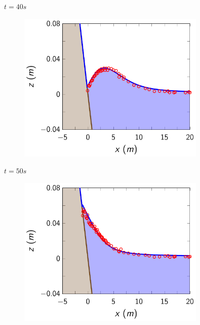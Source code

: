 \documentclass[]{beamer}
\begin{document}
\begin{frame}{$t=40s$}
	\begin{figure}
		\includegraphics[width=0.8\textwidth]{./Pics/DryBed/Syn/t=40s.pdf}
	\end{figure}
\end{frame}

\begin{frame}{$t=50s$}
	\begin{figure}
		\includegraphics[width=0.8\textwidth]{./Pics/DryBed/Syn/t=50s.pdf}
	\end{figure}
\end{frame}
\end{document}

